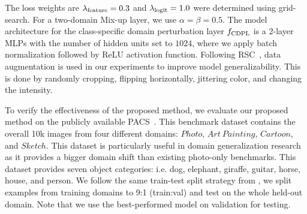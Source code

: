 \documentclass[10pt,twocolumn,letterpaper]{article}
\newcommand{\myparagraph}[1]{\vspace{4pt}\noindent{\bf #1}}
\begin{document}
The loss weights are $\lambda_\textnormal{feature}=0.3$ and $\lambda_\textnormal{logit}=1.0$ were determined using grid-search. For a two-domain Mix-up layer, we use $\alpha=\beta=0.5$. The model architecture for the class-specific domain perturbation layer $f_\textnormal{CDPL}$ is a 2-layer MLPs with the number of hidden units set to $1024$, where we apply batch normalization followed by ReLU activation function. Following RSC~\cite{huangRSC2020}, data augmentation is used in our experiments to improve model generalizability. This is done by randomly cropping, flipping horizontally, jittering color, and changing the intensity.

\myparagraph{Dataset}
To verify the effectiveness of the proposed method, we evaluate our proposed method on the publicly available PACS~\cite{Li2017dg}. This benchmark dataset contains the overall 10k images from four different domains: $Photo$, $Art \ Painting$, $Cartoon$, and $Sketch$. This dataset is particularly useful in domain generalization research as it provides a bigger domain shift than existing photo-only benchmarks. This dataset provides seven object categories: i.e. dog, elephant, giraffe, guitar, horse, house, and person. We follow the same train-test split strategy from \cite{Li2017dg}, we split examples from training domains to 9:1 (train:val) and test on the whole held-out domain. Note that we use the best-performed model on validation for testing.


{
\setlength{\tabcolsep}{4pt}
\renewcommand{\arraystretch}{1.3} 
\begin{table}[t]
	\begin{center}
	    \caption{Image recognition accuracy (\%) comparison with the state-of-the-art approach, RSC~\cite{huangRSC2020}, on PACS~\cite{Li2017dg} test set. We also report standard deviation from a set of 20 models individually trained for each model and each test domain.}
	    \label{tab:pacs_benchmark}
     \end{center}
\end{table}
}
\end{document}
